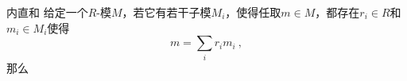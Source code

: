 





\begin{definition}{内直和}
给定一个$R$-模$M$，若它有若干子模$M_i$，使得任取$m\in M$，都存在$r_i\in R$和$m_i\in M_i$使得
\begin{equation}
m = \sum_i r_im_i~, 
\end{equation}
那么
\end{definition}

















